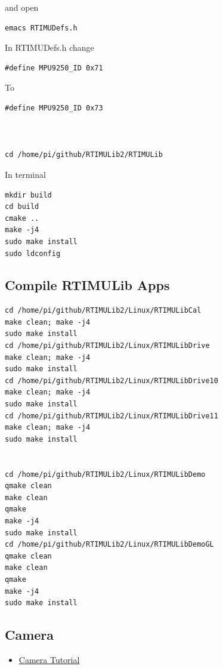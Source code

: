 and open

\begin{verbatim}
emacs RTIMUDefs.h
\end{verbatim}

In RTIMUDefs.h change

\begin{verbatim}
#define MPU9250_ID 0x71
\end{verbatim}

To

\begin{verbatim}
#define MPU9250_ID 0x73



cd /home/pi/github/RTIMULib2/RTIMULib
\end{verbatim}

In terminal

\begin{verbatim}
mkdir build
cd build
cmake ..
make -j4
sudo make install
sudo ldconfig
\end{verbatim}

\subsection{Compile RTIMULib Apps}\label{compile-rtimulib-apps}

\begin{verbatim}
cd /home/pi/github/RTIMULib2/Linux/RTIMULibCal
make clean; make -j4
sudo make install
cd /home/pi/github/RTIMULib2/Linux/RTIMULibDrive
make clean; make -j4
sudo make install
cd /home/pi/github/RTIMULib2/Linux/RTIMULibDrive10
make clean; make -j4
sudo make install
cd /home/pi/github/RTIMULib2/Linux/RTIMULibDrive11
make clean; make -j4
sudo make install


cd /home/pi/github/RTIMULib2/Linux/RTIMULibDemo    
qmake clean
make clean
qmake
make -j4
sudo make install
cd /home/pi/github/RTIMULib2/Linux/RTIMULibDemoGL
qmake clean
make clean
qmake
make -j4
sudo make install
\end{verbatim}

\subsection{Camera}\label{camera}

\begin{itemize}
\tightlist
\item
  \href{https://www.raspberrypi.org/learning/getting-started-with-picamera/worksheet/}{Camera
  Tutorial}
\end{itemize}

